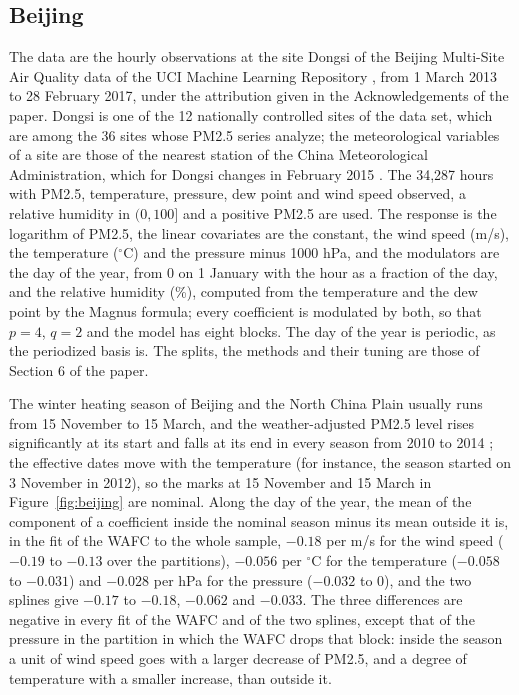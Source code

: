 



\subsection*{Beijing}

The data are the hourly observations at the site Dongsi of the Beijing
Multi-Site Air Quality data of the UCI Machine Learning Repository
\citep{Chen-UCI-2017}, from 1 March 2013 to 28 February 2017, under the
attribution given in the Acknowledgements of the paper. Dongsi is one of
the 12 nationally controlled sites of the data set, which are among the 36
sites whose PM2.5 series \citet{Zhang-Guo-Dong-He-Xu-Chen-2017} analyze;
the meteorological variables of a site are those of the nearest station of
the China Meteorological Administration, which for Dongsi changes in
February 2015 \citep[Table~S1 of their Supplementary
Material]{Zhang-Guo-Dong-He-Xu-Chen-2017}. The 34,287 hours with PM2.5,
temperature, pressure, dew point and wind speed observed, a relative humidity in $(0,100]$
and a positive PM2.5 are used. The response is the logarithm of PM2.5, the
linear covariates are the constant, the wind speed (m/s), the temperature
($^{\circ}$C) and the pressure minus 1000 hPa, and the modulators are the day
of the year, from 0 on 1 January with the hour as a fraction of the day, and
the relative humidity (\%), computed from the temperature and the dew point by
the Magnus formula; every coefficient is modulated by both, so that $p = 4$,
$q = 2$ and the model has eight blocks. The day of the year is periodic, as
the periodized basis is. The splits, the methods and their tuning are those
of Section 6 of the paper.

The winter heating season of Beijing and the North China Plain usually runs
from 15 November to 15 March, and the weather-adjusted PM2.5 level rises
significantly at its start and falls at its end in every season from 2010 to
2014 \citep[Section~7]{Liang-Zou-Guo-Li-Zhang-Zhang-Huang-Chen-2015}; the
effective dates move with the temperature (for instance, the season started
on 3 November in 2012), so the marks at 15 November and 15 March in
Figure~\ref{fig:beijing} are nominal. Along the day of the year, the mean of
the component of a coefficient inside the nominal season minus its mean
outside it is, in the fit of the WAFC to the whole sample, $-0.18$ per m/s
for the wind speed ($-0.19$ to $-0.13$ over the partitions), $-0.056$ per
$^{\circ}$C for the temperature ($-0.058$ to $-0.031$) and $-0.028$ per hPa
for the pressure ($-0.032$ to 0), and the two splines give $-0.17$ to
$-0.18$, $-0.062$ and $-0.033$. The three differences are negative in every
fit of the WAFC and of the two splines, except that of the pressure in the
partition in which the WAFC drops that block: inside the season a unit of
wind speed goes with a larger decrease of PM2.5, and a degree of temperature
with a smaller increase, than outside it.

